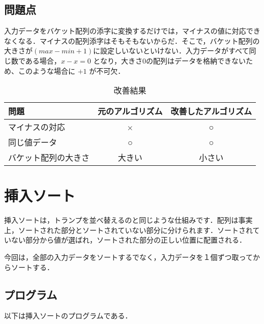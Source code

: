 \documentclass[a4j, titlepage]{jarticle}
\begin{document}

        \subsection{問題点}
            入力データをバケット配列の添字に変換するだけでは，マイナスの値に対応できなくなる．マイナスの配列添字はそもそもないからだ．そこで，バケット配列の大きさが$(max - min + 1)$に設定しいないといけない．入力データがすべて同じ数である場合，$ x - x = 0 $ となり，大きさ0の配列はデータを格納できないため、このような場合に $+ 1$ が不可欠．
            \begin{table}[t]
                \caption{改善結果}
                \label{tab:bucket_problem}
                \begin{center}
                    \begin{tabular}{|l|c|c|}
                        \hline
                        問題 & 元のアルゴリズム & 改善したアルゴリズム\\ \hline
                        マイナスの対応 & × & ○\\ \hline
                        同じ値データ & ○ & ○\\ \hline
                        バケット配列の大きさ & 大きい & 小さい\\ \hline
                    \end{tabular}
                \end{center}
            \end{table}

    
    \section{挿入ソート}
        挿入ソートは，トランプを並べ替えるのと同じような仕組みです．配列は事実上，ソートされた部分とソートされていない部分に分けられます．ソートされていない部分から値が選ばれ，ソートされた部分の正しい位置に配置される．

        今回は，全部の入力データをソートするでなく，入力データを１個ずつ取ってからソートする．
    
        \subsection{プログラム}
            以下は挿入ソートのプログラムである．
            
\end{document}
